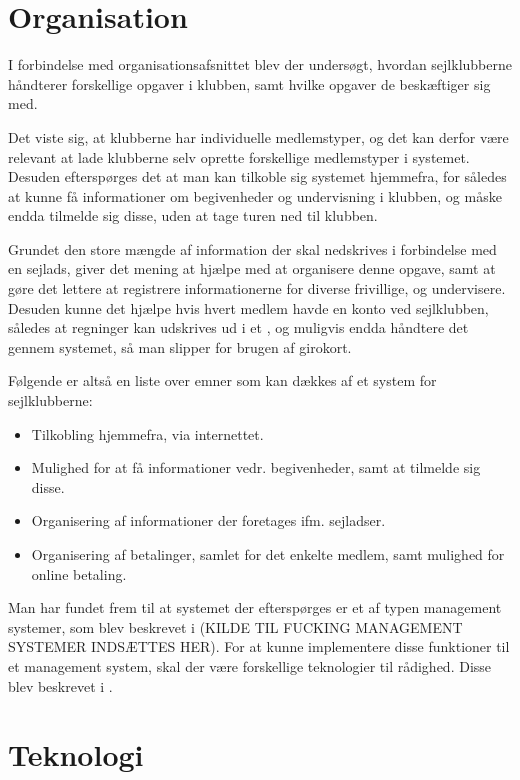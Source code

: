 \section{Organisation}

I forbindelse med organisationsafsnittet blev der undersøgt, hvordan sejlklubberne håndterer forskellige
opgaver i klubben, samt hvilke opgaver de beskæftiger sig med.

Det viste sig, at klubberne har individuelle medlemstyper, og det kan derfor være relevant at lade klubberne
selv oprette forskellige medlemstyper i systemet. Desuden efterspørges det at man kan tilkoble sig systemet
hjemmefra, for således at kunne få informationer om begivenheder og undervisning i klubben, og måske endda
tilmelde sig disse, uden at tage turen ned til klubben.

Grundet den store mængde af information der skal nedskrives i forbindelse med en sejlads, giver det mening at
hjælpe med at organisere denne opgave, samt at gøre det lettere at registrere informationerne for diverse
frivillige, og undervisere. Desuden kunne det hjælpe hvis hvert medlem havde en konto ved sejlklubben, således
at regninger kan udskrives ud i et , og muligvis endda håndtere det gennem
systemet, så man slipper for brugen af girokort.

Følgende er altså en liste over emner som kan dækkes af et system for sejlklubberne:

\begin{itemize}
  \item Tilkobling hjemmefra, via internettet.
  \item Mulighed for at få informationer vedr. begivenheder, samt at tilmelde sig disse.
  \item Organisering af informationer der foretages ifm. sejladser.
  \item Organisering af betalinger, samlet for det enkelte medlem, samt mulighed for online betaling.
\end{itemize}

Man har fundet frem til at systemet der efterspørges er et af typen management systemer, som blev beskrevet i
(KILDE TIL FUCKING MANAGEMENT SYSTEMER INDSÆTTES HER). For at kunne implementere disse funktioner til et
management system, skal der være forskellige teknologier til rådighed. Disse blev beskrevet i
.


\section{Teknologi}

